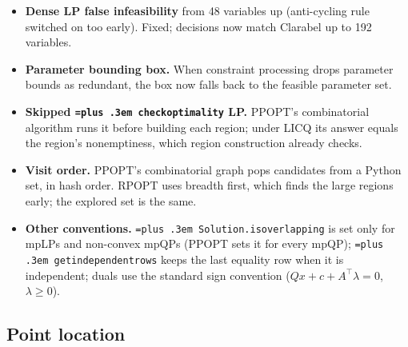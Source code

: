 \documentclass[10pt,a4paper]{article}
\newcommand{\rpopt}{RPOPT}
\newcommand{\ppopt}{PPOPT}
\newcommand{\code}[1]{{\let\_\bu\texttt{\spaceskip=\fontdimen2\font plus .3em #1}}}
\newcommand{\bu}{\textunderscore\hspace{0pt}}
\begin{document}
\begin{itemize}
  \item \textbf{Dense LP false infeasibility} from 48 variables up (anti-cycling rule switched on too early). Fixed; decisions now match Clarabel up to 192 variables.
  \item \textbf{Parameter bounding box.} When constraint processing drops parameter bounds as redundant, the box now falls back to the feasible parameter set.
  \item \textbf{Skipped \code{check\_optimality} LP.} \ppopt{}'s combinatorial algorithm runs it before building each region; under LICQ its answer equals the region's nonemptiness, which region construction already checks.
  \item \textbf{Visit order.} \ppopt{}'s combinatorial graph pops candidates from a Python set, in hash order. \rpopt{} uses breadth first, which finds the large regions early; the explored set is the same.
  \item \textbf{Other conventions.} \code{Solution.is\_overlapping} is set only for mpLPs and non-convex mpQPs (\ppopt{} sets it for every mpQP); \code{get\_independent\_rows} keeps the last equality row when it is independent; duals use the standard sign convention ($Qx+c+A^\top\lambda=0$, $\lambda\ge0$).
\end{itemize}

\subsection{Point location}
\end{document}
